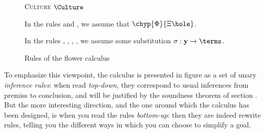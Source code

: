 \begin{figure*}
\begin{framed}
  \vspace{3em}

  {\textsc{Culture} $\Culture$}
  \vspace{1.5em}

  \vspace{3em}

  In the rules  and , we assume that
  $\chyp{\Phi}{\Xi\hole}$.
  
  In the rules , , , , we assume
  some substitution $\sigma : \mathbf{y} \to \terms$.
  \end{framed}
  \caption{Rules of the flower calculus}
\end{figure*}


To emphasize this viewpoint, the calculus is presented in figure
 as a set of unary \emph{inference rules}: when read
\emph{top-down}, they correspond to usual inferences from premiss to conclusion,
and will be justified by the soundness theorem of section .
But the more interesting direction, and the one around which the calculus has
been designed, is when you read the rules \emph{bottom-up}: then they are indeed
rewrite rules, telling you the different ways in which you can choose to
simplify a goal.

